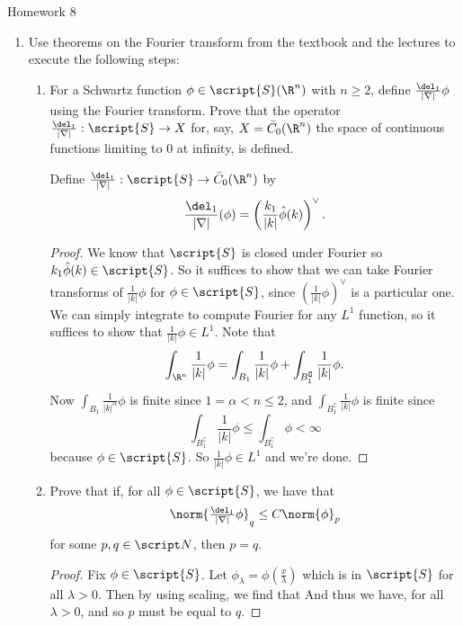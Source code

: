 \documentclass[12pt,letterpaper]{article}
\let\oldphi\phi
\renewcommand{\phi}{\varphi}
\begin{document}
\pagestyle{fancy}
\begin{center}
{\Large Homework 8}%
\end{center}

\renewcommand{\B}{\bar{B}(\ell^\infty)}
\newcommand{\Rn}{\R^n}
\renewcommand{\phi}{\oldphi}
\renewcommand{\S}{\script{S}}

\begin{enumerate}
\item Use theorems on the Fourier transform from the textbook and the lectures to execute the following steps:
	\begin{enumerate}[label=(\alph*)]
	\item For a Schwartz function $\phi\in\script{S}(\Rn)$ with $n\geq 2$, define $\frac{\del_1}{|\nabla|}\phi$ using the Fourier transform. Prove that the operator $\frac{\del_1}{|\nabla|}:\script{S}\to X$ for, say, $X=\bar{C}_0(\Rn)$ the space of continuous functions limiting to 0 at infinity, is
defined.
	\begin{definition*}
	Define $\frac{\del_1}{|\nabla|}:\script{S}\to \bar{C}_0(\Rn)$ by 
	$$\frac{\del_1}{|\nabla|}(\phi)=\left(\frac{k_1}{|k|}\hat{\phi}(k)\right)^\vee.$$
	\end{definition*}
	\begin{proof}
	We know that $\S$ is closed under Fourier so $k_1 \hat{\phi}(k)\in \S$. So it suffices to show that we can take Fourier transforms of $\frac{1}{|k|}\phi$ for $\phi\in\S$, since $\left(\frac{1}{|k|}\phi\right)^\vee$ is a particular one. We can simply integrate to compute Fourier for any $L^1$ function, so it suffices to show that $\frac{1}{|k|}\phi\in L^1$. Note that 
	$$\int_{\Rn}\frac{1}{|k|}\phi = \int_{B_1}\frac{1}{|k|}\phi + \int_{B_1^\complement}\frac{1}{|k|}\phi.$$
	Now $\int_{B_1}\frac{1}{|k|^\alpha}\phi$ is finite since $1=\alpha<n\leq 2$, and $\int_{B_1^\complement}\frac{1}{|k|}\phi$ is finite since 
	$$\int_{B_1^\complement}\frac{1}{|k|}\phi\leq \int_{B_1^\complement}\phi<\infty$$
	because $\phi\in\S$. So $\frac{1}{|k|}\phi\in L^1$ and we're done.
	\end{proof}
	
	\item Prove that if, for all $\phi\in\S$, we have that 
	$$\norm{\tfrac{\del_1}{|\nabla|}\phi}_q\leq C\norm{\phi}_p$$
	for some $p,q\in\N$, then $p=q$.
	\begin{proof}
	Fix $\phi\in\S$. Let $\phi_\lambda=\phi(\frac{x}{\lambda})$ which is in $\S$ for all $\lambda>0$. Then by using scaling, we find that 
	And thus we have, for all $\lambda>0$, 
	and so $p$ must be equal to $q$. 
	\end{proof}
	

\end{enumerate}
\end{enumerate}
\end{document}
